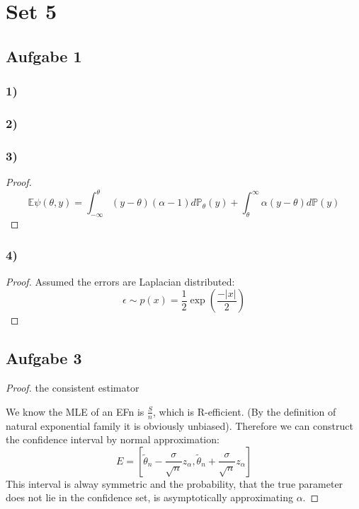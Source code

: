 \documentclass[a4paper,11pt]{article}
\theoremstyle{definition}
\theoremstyle{remark}
\begin{document}

\section*{Set 5}
\subsection*{Aufgabe 1}
\subsubsection*{1)}


\subsubsection*{2)}

\subsubsection*{3)}
\begin{proof}
	\begin{equation*}
		\mathbb{E} \psi(\theta, y) = \int_{-\infty}^\theta (y - \theta)(\alpha - 1) d\mathbb{P}_\theta(y)
		 + \int_\theta^\infty \alpha(y - \theta) d\mathbb{P}(y)
	\end{equation*}
\end{proof}

\subsubsection*{4)}
\begin{proof}
	Assumed the errors are Laplacian distributed:
	\begin{equation*}
		\epsilon \sim p(x) = \frac{1}{2}\exp(\frac{-|x|}{2})
	\end{equation*}
\end{proof}



\subsection*{Aufgabe 3}

\begin{proof}
	the consistent estimator



	We know the MLE of an EFn is $\frac{S}{n}$, which is R-efficient. (By the definition of natural exponential family it is obviously unbiased). Therefore we can construct the confidence interval by normal approximation:
	\begin{equation*}
		E = [\tilde{\theta}_n - \frac{\sigma}{\sqrt{n}}z_\alpha, \tilde{\theta}_n + \frac{\sigma}{\sqrt{n}}z_\alpha]
	\end{equation*}
	This interval is alway symmetric and the probability, that the true parameter does not lie in the confidence set, is asymptotically approximating $\alpha$.
\end{proof}
\end{document}
